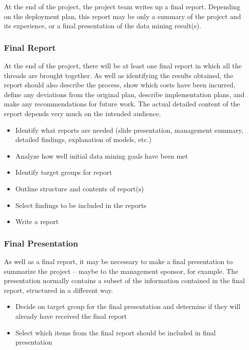 \documentclass[
]{article}
\providecommand{\tightlist}{%
  \setlength{\itemsep}{0pt}\setlength{\parskip}{0pt}}
\begin{document}
At the end of the project, the project team writes up a final report.
Depending on the deployment plan, this report may be only a summary of
the project and its experience, or a final presentation of the data
mining result(s).

\hypertarget{final-report}{%
\subsubsection{Final Report}\label{final-report}}

At the end of the project, there will be at least one final report in
which all the threads are brought together. As well as identifying the
results obtained, the report should also describe the process, show
which costs have been incurred, define any deviations from the original
plan, describe implementation plans, and make any recommendations for
future work. The actual detailed content of the report depends very much
on the intended audience.

\begin{itemize}
\tightlist
\item
  Identify what reports are needed (slide presentation, management
  summary, detailed findings, explanation of models, etc.)
\item
  Analyze how well initial data mining goals have been met
\item
  Identify target groups for report
\item
  Outline structure and contents of report(s)
\item
  Select findings to be included in the reports
\item
  Write a report
\end{itemize}

\hypertarget{final-presentation}{%
\subsubsection{Final Presentation}\label{final-presentation}}

As well as a final report, it may be necessary to make a final
presentation to summarize the project -- maybe to the management
sponsor, for example. The presentation normally contains a subset of the
information contained in the final report, structured in a different
way.

\begin{itemize}
\tightlist
\item
  Decide on target group for the final presentation and determine if
  they will already have received the final report
\item
  Select which items from the final report should be included in final
  presentation
\end{itemize}
\end{document}

